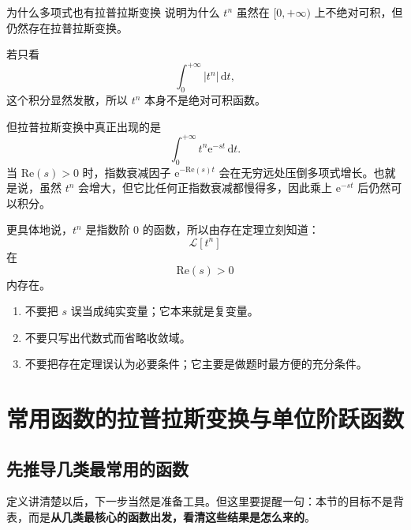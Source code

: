 \begin{lizi}{为什么多项式也有拉普拉斯变换}{}
说明为什么 $t^n$ 虽然在 $[0,+\infty)$ 上不绝对可积，但仍然存在拉普拉斯变换。

\begin{jie}
若只看
\[
    \int_0^{+\infty} |t^n|\,\mathrm{d}t,
\]
这个积分显然发散，所以 $t^n$ 本身不是绝对可积函数。

但拉普拉斯变换中真正出现的是
\[
    \int_0^{+\infty} t^n \mathrm{e}^{-st}\,\mathrm{d}t.
\]
当 $\mathrm{Re}(s)>0$ 时，指数衰减因子 $\mathrm{e}^{-\mathrm{Re}(s)t}$ 会在无穷远处压倒多项式增长。也就是说，虽然 $t^n$ 会增大，但它比任何正指数衰减都慢得多，因此乘上 $\mathrm{e}^{-st}$ 后仍然可以积分。

更具体地说，$t^n$ 是指数阶 $0$ 的函数，所以由存在定理立刻知道：
\[
    \mathcal{L}[t^n]
\]
在
\[
    \mathrm{Re}(s)>0
\]
内存在。
\end{jie}
\end{lizi}

\begin{jinshi}[这一节最容易错的地方]
\begin{enumerate}
    \item 不要把 $s$ 误当成纯实变量；它本来就是复变量。
    \item 不要只写出代数式而省略收敛域。
    \item 不要把存在定理误认为必要条件；它主要是做题时最方便的充分条件。
\end{enumerate}
\end{jinshi}

\section{常用函数的拉普拉斯变换与单位阶跃函数}

\subsection{先推导几类最常用的函数}

定义讲清楚以后，下一步当然是准备工具。但这里要提醒一句：本节的目标不是背表，而是\textbf{从几类最核心的函数出发，看清这些结果是怎么来的}。

